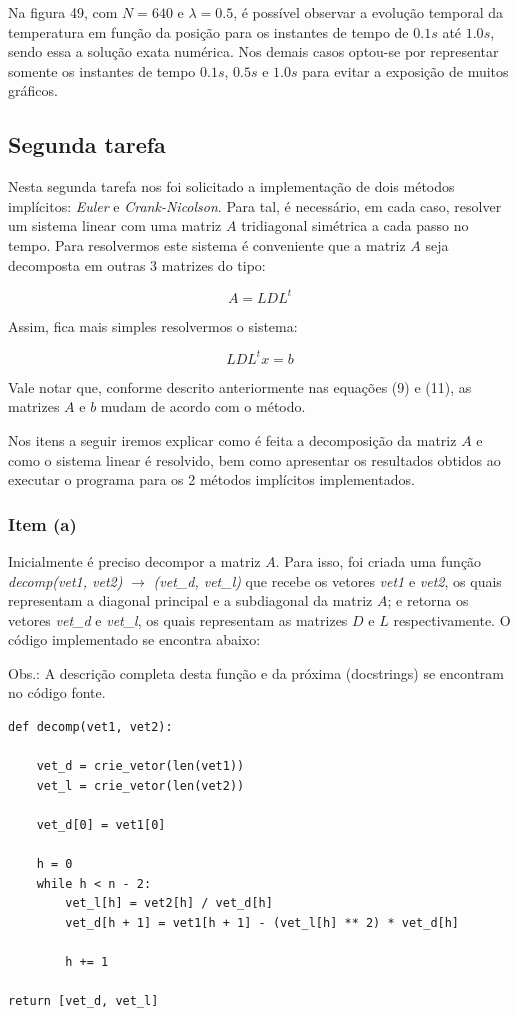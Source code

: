 \documentclass[a4paper, 12pt]{article}
\begin{document}
Na figura 49, com $N=640$ e $\lambda = 0.5$, é possível observar a evolução temporal da temperatura em função da posição para os instantes de tempo de $0.1s$ até $1.0s$, sendo essa a solução exata numérica. Nos demais casos optou-se por representar somente os instantes de tempo $0.1s$, $0.5s$ e $1.0s$ para evitar a exposição de muitos gráficos. 


\subsection{Segunda tarefa}

Nesta segunda tarefa nos foi solicitado a implementação de dois métodos implícitos: \textit{Euler} e \textit{Crank-Nicolson}. Para tal, é necessário, em cada caso, resolver um sistema linear com uma matriz $A$ tridiagonal simétrica a cada passo no tempo. Para resolvermos este sistema é conveniente que a matriz $A$ seja decomposta em outras 3 matrizes do tipo:

$$
A=LDL^t
$$

Assim, fica mais simples resolvermos o sistema:

$$
LDL^{t} x = b
$$

Vale notar que, conforme descrito anteriormente nas equações (9) e (11), as matrizes $A$ e $b$ mudam de acordo com o método. 

Nos itens a seguir iremos explicar como é feita a decomposição da matriz $A$ e como o sistema linear é resolvido, bem como apresentar os resultados obtidos ao executar o programa para os 2 métodos implícitos implementados.

\subsubsection{Item (a)}

Inicialmente é preciso decompor a matriz $A$. Para isso, foi criada uma função \\ \textit{decomp(vet1, vet2)} $\rightarrow$ \textit{(vet\_d, vet\_l)} que recebe os vetores \textit{vet1} e \textit{vet2}, os quais representam a diagonal principal e a subdiagonal da matriz $A$; e retorna os vetores \textit{vet\_d} e \textit{vet\_l}, os quais representam as matrizes $D$ e $L$ respectivamente. O código implementado se encontra abaixo:

Obs.: A descrição completa desta função e da próxima (docstrings) se encontram no código fonte.

\begin{verbatim}
def decomp(vet1, vet2):
        
    vet_d = crie_vetor(len(vet1))
    vet_l = crie_vetor(len(vet2))

    vet_d[0] = vet1[0]
    
    h = 0
    while h < n - 2:
        vet_l[h] = vet2[h] / vet_d[h]
        vet_d[h + 1] = vet1[h + 1] - (vet_l[h] ** 2) * vet_d[h]
    
        h += 1

return [vet_d, vet_l]
\end{verbatim}
\end{document}
